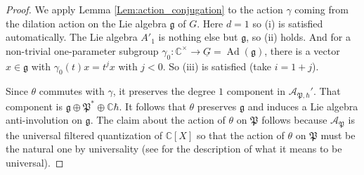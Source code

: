 \documentclass[12pt]{amsart}
\newcommand{\C}{\mathbb{C}}
\newcommand{\A}{\mathcal{A}}
\newcommand{\g}{\mathfrak{g}}
\newcommand{\Orb}{\mathbb{O}}
\newcommand{\param}{\mathfrak{P}}
\newtheorem{Cor}[Thm]{Corollary}
\theoremstyle{definition}
\numberwithin{equation}{section}
\begin{document}
\begin{proof}
We apply Lemma \ref{Lem:action_conjugation} to the action $\gamma$ coming from the dilation
action on the Lie algebra $\g$ of $G$. Here $d=1$ so  (i) is satisfied automatically. 
The Lie algebra $A'_1$ is nothing else but $\g$, so (ii) holds. And for a non-trivial one-parameter 
subgroup $\gamma_0:\C^\times\rightarrow \underline{G}=\operatorname{Ad}(\g)$, there is a vector 
$x\in \g$ with $\gamma_0(t)x=t^j x$ with $j<0$. So (iii) is satisfied (take $i=1+j$). 

Since $\theta$ commutes with $\gamma$, it preserves the degree
$1$ component in $\A_{\param,\hbar}'$. That component is $\g\oplus \param^*\oplus \C\hbar$. It follows that $\theta$
preserves $\g$ and induces a Lie algebra anti-involution on $\g$.
The claim about the action of $\theta$ on $\param$ follows because
$\A_{\param}$ is the universal filtered quantization of $\C[X]$
so that the action of $\theta$ on $\param$ must be the natural one by universality
(see \cite[Proposition 3.5]{orbit} for the description of what it means to be universal). 
\end{proof}



\end{document}
